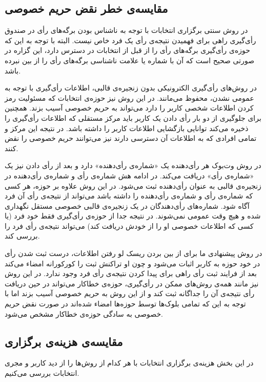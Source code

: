\subsection{مقایسه‌ی خطر نقض حریم خصوصی}
در روش سنتی برگزاری انتخابات با توجه به ناشناس بودن برگه‌های رأی در صندوق رأی‌گیری راهی برای فهمیدن نتیجه‌ی رأی‌ یک فرد خاص نیست. البته با توجه به این که حوزه‌ی رأی‌گیری برگه‌های رأی را از قبل از انتخابات در دسترس دارد، این گزاره در صورتی صحیح است که آن با شماره یا علامت ناشناسی برگه‌های رأی را از بین نبرده باشد.
\par 
در روش‌های رأی‌گیری الکترونیکی بدون زنجیره‌ی قالبی، اطلاعات رأی‌گیری با توجه به عمومی نشدن، محفوظ می‌مانند. در این روش نیز حوزه‌ی انتخابات که مسئولیت رمز کردن اطلاعات شخصی کاربر را دارد می‌تواند به حریم خصوصی آسیب بزند. همچنین برای جلوگیری از دو بار رأی دادن یک کاربر باید مرکز مستقلی که اطلاعات رأی‌گیری را ذخیره می‌کند توانایی بازگشایی اطلاعات کاربر را داشته باشد. در نتیجه این مرکز و تمامی افرادی که به اطلاعات آن دسترسی دارند نیز می‌توانند حریم خصوصی را نقض کنند. 
\par
در روش وت‌بوک هر رأی‌دهنده یک «شماره‌ی رأی‌دهنده» دارد و بعد از رأی دادن نیز یک «شماره‌ی رأی» دریافت می‌کند. در ادامه هش شماره‌ی رأی و شماره‌ی رأی‌دهنده در زنجیره‌ی قالبی به عنوان رأی‌دهنده ثبت می‌شود. در این روش علاوه بر حوزه، هر کسی که شماره‌ی رأی و شماره‌ی رأی‌دهنده را داشته باشد می‌تواند از نتیجه‌ی رأی آن فرد آگاه شود. شماره‌های رأی‌دهندگان در یک زنجیره‌ی قالبی خصوصی مستقل نگهداری شده و هیچ وقت عمومی نمی‌شوند. در نتیجه جدا از حوزه‌ی رأی‌گیری فقط خود فرد (یا کسی که اطلاعات خصوصی او را از خودش دریافت کند) می‌تواند نتیجه‌ی رأی فرد را بررسی کند. 
\par 
در روش پیشنهادی ما برای از بین بردن ریسک لو رفتن اطلاعات، درست ثبت شدن رأی در خود حوزه به کاربر اثبات می‌شود و چون او تراکنش ثبت را کورکورانه امضاء می‌کند بعد از فرایند ثبت رأی راهی برای پیدا کردن نتیجه‌ی رأی فرد وجود ندارد. در این روش نیز مانند همه‌ی روش‌های ممکن در رأی‌گیری، حوزه‌ی خطاکار می‌تواند در حین دریافت رأی نتیجه‌ی آن را جداگانه ثبت کند و از این روش به حریم خصوصی آسیب بزند اما با توجه به این که تمامی بلوک‌ها توسط حوزه‌ها امضاء شده‌اند در صورت نقض حریم خصوصی به سادگی حوزه‌ی خطاکار مشخص می‌شود.

\subsection{مقایسه‌ی هزینه‌ی برگزاری}
در این بخش هزینه‌ی برگزاری انتخابات با هر کدام از روش‌ها را از دید کاربر و مجری انتخابات بررسی می‌کنیم.
